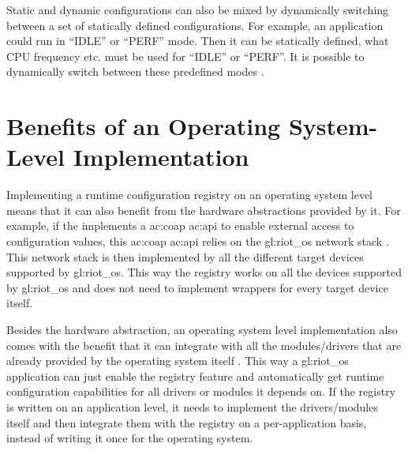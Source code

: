 Static and dynamic configurations can also be mixed by dynamically switching between a set of statically defined configurations.
For example, an application could run in ``IDLE'' or ``PERF'' mode.
Then it can be statically defined, what CPU frequency etc. must be used for ``IDLE'' or ``PERF''. It is possible to dynamically switch between these predefined modes \cite{4253243}.

\section{Benefits of an Operating System-Level Implementation}
\label{sec:background:benefits_of_an_operating_system_level_implementation}

Implementing a runtime configuration registry on an operating system level means that it can also benefit from the hardware abstractions provided by it.
For example, if the  implements a \gls{ac:coap} \gls{ac:api} to enable external access to configuration values, this \gls{ac:coap} \gls{ac:api} relies on the \gls{gl:riot_os} network stack \cite{lkhpg-cwemr-18}. This network stack is then implemented by all the different target devices supported by \gls{gl:riot_os}.
This way the registry works on all the devices supported by \gls{gl:riot_os} and does not need to implement wrappers for every target device itself.

Besides the hardware abstraction, an operating system level implementation also comes with the benefit that it can integrate with all the modules/drivers that are already provided by the operating system itself \cite{riot_drivers}.
This way a \gls{gl:riot_os} application can just enable the registry feature and automatically get runtime configuration capabilities for all drivers or modules it depends on.
If the registry is written on an application level, it needs to implement the drivers/modules itself and then integrate them with the registry on a per-application basis, instead of writing it once for the operating system.